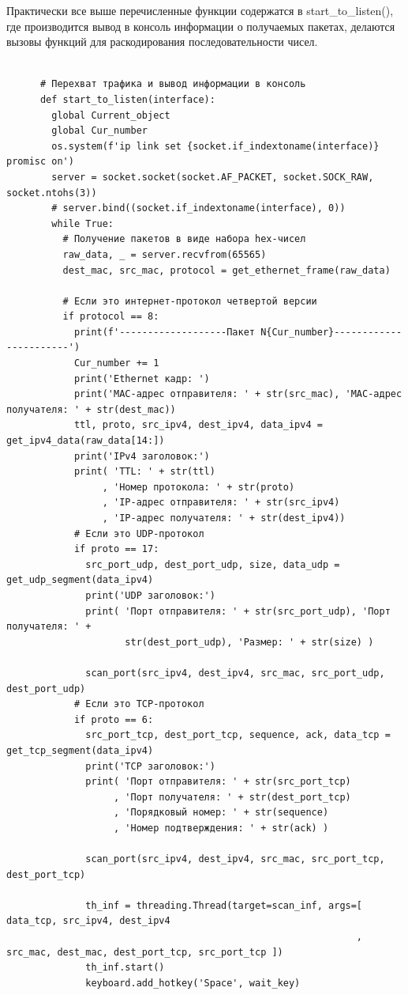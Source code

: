 \documentclass[bachelor, och, coursework]{SCWorks}
\begin{document}
    Практически все выше перечисленные функции содержатся в start_to_listen(), где производится вывод в консоль информации о получаемых пакетах, делаются
    вызовы функций для раскодирования последовательности чисел.

    \begin{verbatim}

      # Перехват трафика и вывод информации в консоль
      def start_to_listen(interface):
        global Current_object
        global Cur_number
        os.system(f'ip link set {socket.if_indextoname(interface)} promisc on')
        server = socket.socket(socket.AF_PACKET, socket.SOCK_RAW, socket.ntohs(3))
        # server.bind((socket.if_indextoname(interface), 0))
        while True:
          # Получение пакетов в виде набора hex-чисел
          raw_data, _ = server.recvfrom(65565)
          dest_mac, src_mac, protocol = get_ethernet_frame(raw_data)
      
          # Если это интернет-протокол четвертой версии    
          if protocol == 8:
            print(f'-------------------Пакет N{Cur_number}-----------------------')
            Cur_number += 1
            print('Ethernet кадр: ')
            print('MAC-адрес отправителя: ' + str(src_mac), 'MAC-адрес получателя: ' + str(dest_mac))
            ttl, proto, src_ipv4, dest_ipv4, data_ipv4 = get_ipv4_data(raw_data[14:])
            print('IPv4 заголовок:')
            print( 'TTL: ' + str(ttl)
                 , 'Номер протокола: ' + str(proto)
                 , 'IP-адрес отправителя: ' + str(src_ipv4)
                 , 'IP-адрес получателя: ' + str(dest_ipv4))
            # Если это UDP-протокол  
            if proto == 17:
              src_port_udp, dest_port_udp, size, data_udp = get_udp_segment(data_ipv4)
              print('UDP заголовок:')
              print( 'Порт отправителя: ' + str(src_port_udp), 'Порт получателя: ' + 
                     str(dest_port_udp), 'Размер: ' + str(size) )
              
              scan_port(src_ipv4, dest_ipv4, src_mac, src_port_udp, dest_port_udp)
            # Если это TCP-протокол  
            if proto == 6:
              src_port_tcp, dest_port_tcp, sequence, ack, data_tcp = get_tcp_segment(data_ipv4)
              print('TCP заголовок:')
              print( 'Порт отправителя: ' + str(src_port_tcp)
                   , 'Порт получателя: ' + str(dest_port_tcp)
                   , 'Порядковый номер: ' + str(sequence)
                   , 'Номер подтверждения: ' + str(ack) )
      
              scan_port(src_ipv4, dest_ipv4, src_mac, src_port_tcp, dest_port_tcp)
              
              th_inf = threading.Thread(target=scan_inf, args=[ data_tcp, src_ipv4, dest_ipv4
                                                              , src_mac, dest_mac, dest_port_tcp, src_port_tcp ])
              th_inf.start()
              keyboard.add_hotkey('Space', wait_key)
    \end{verbatim}
\end{document}
